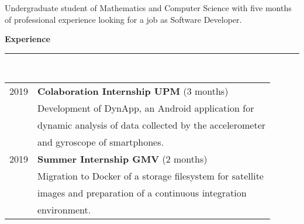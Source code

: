 \documentclass{article}
\begin{document}
\hspace{0.25cm}\vline\hspace{0.25cm}
\begin{minipage}[c]{0.66\linewidth}
  \setlength{\parskip}{0.3em}

  \begin{center}
    \Large Undergraduate student of Mathematics and Computer Science with five months of professional experience looking for a job as Software Developer.
  \end{center}

  \textbf{\Large{\color{BlueViolet}Experience}}\\[-0.25cm]
  {\color{BlueViolet} \rule{\linewidth}{0.1mm} }\\[-0.25cm]
  \begin{tabular}{l l}
    2019 & \textbf{Colaboration Internship UPM} (3 months)\\
         & Development of DynApp, an Android application for \\
         & dynamic analysis of data collected by the accelerometer \\
         & and gyroscope of smartphones.\\[0.3cm]
    2019 & \textbf{Summer Internship GMV} (2 months)\\
         & Migration to Docker of a storage filesystem for satellite \\
         & images and preparation of a continuous integration \\
         & environment.
  \end{tabular}
  \vspace{0.3cm}
  

\end{minipage}
\end{document}
